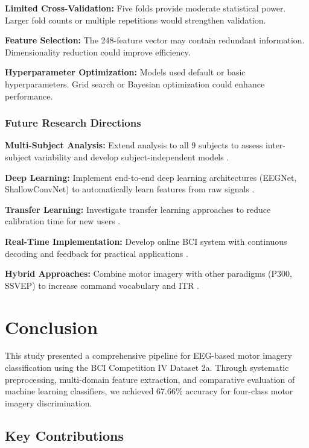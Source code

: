 \documentclass[11pt]{article}
\begin{document}
\textbf{Limited Cross-Validation:} Five folds provide moderate statistical power. Larger fold counts or multiple repetitions would strengthen validation.

\textbf{Feature Selection:} The 248-feature vector may contain redundant information. Dimensionality reduction could improve efficiency.

\textbf{Hyperparameter Optimization:} Models used default or basic hyperparameters. Grid search or Bayesian optimization could enhance performance.

\subsubsection{Future Research Directions}

\textbf{Multi-Subject Analysis:} Extend analysis to all 9 subjects to assess inter-subject variability and develop subject-independent models \citep{lotte2018review}.

\textbf{Deep Learning:} Implement end-to-end deep learning architectures (EEGNet, ShallowConvNet) to automatically learn features from raw signals \citep{lotte2018review}.

\textbf{Transfer Learning:} Investigate transfer learning approaches to reduce calibration time for new users \citep{lotte2018review}.

\textbf{Real-Time Implementation:} Develop online BCI system with continuous decoding and feedback for practical applications \citep{wolpaw2000brain}.

\textbf{Hybrid Approaches:} Combine motor imagery with other paradigms (P300, SSVEP) to increase command vocabulary and ITR \citep{pfurtscheller1999motor}.

\section{Conclusion}

This study presented a comprehensive pipeline for EEG-based motor imagery classification using the BCI Competition IV Dataset 2a. Through systematic preprocessing, multi-domain feature extraction, and comparative evaluation of machine learning classifiers, we achieved 67.66\% accuracy for four-class motor imagery discrimination.

\subsection{Key Contributions}
\end{document}
